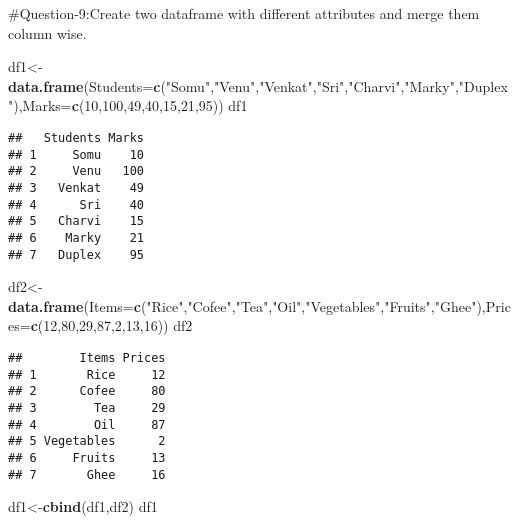 \documentclass[
]{article}
\newenvironment{Shaded}{\begin{snugshade}}{\end{snugshade}}
\newcommand{\AttributeTok}[1]{\textcolor[rgb]{0.13,0.29,0.53}{#1}}
\newcommand{\DecValTok}[1]{\textcolor[rgb]{0.00,0.00,0.81}{#1}}
\newcommand{\FunctionTok}[1]{\textcolor[rgb]{0.13,0.29,0.53}{\textbf{#1}}}
\newcommand{\NormalTok}[1]{#1}
\newcommand{\OtherTok}[1]{\textcolor[rgb]{0.56,0.35,0.01}{#1}}
\newcommand{\StringTok}[1]{\textcolor[rgb]{0.31,0.60,0.02}{#1}}
\begin{document}
\#Question-9:Create two dataframe with different attributes and merge
them column wise.

\begin{Shaded}
\begin{Highlighting}[]
\NormalTok{df1}\OtherTok{\textless{}{-}}\FunctionTok{data.frame}\NormalTok{(}\AttributeTok{Students=}\FunctionTok{c}\NormalTok{(}\StringTok{"Somu"}\NormalTok{,}\StringTok{"Venu"}\NormalTok{,}\StringTok{"Venkat"}\NormalTok{,}\StringTok{"Sri"}\NormalTok{,}\StringTok{"Charvi"}\NormalTok{,}\StringTok{"Marky"}\NormalTok{,}\StringTok{"Duplex"}\NormalTok{),}\AttributeTok{Marks=}\FunctionTok{c}\NormalTok{(}\DecValTok{10}\NormalTok{,}\DecValTok{100}\NormalTok{,}\DecValTok{49}\NormalTok{,}\DecValTok{40}\NormalTok{,}\DecValTok{15}\NormalTok{,}\DecValTok{21}\NormalTok{,}\DecValTok{95}\NormalTok{))}
\NormalTok{df1}
\end{Highlighting}
\end{Shaded}

\begin{verbatim}
##   Students Marks
## 1     Somu    10
## 2     Venu   100
## 3   Venkat    49
## 4      Sri    40
## 5   Charvi    15
## 6    Marky    21
## 7   Duplex    95
\end{verbatim}

\begin{Shaded}
\begin{Highlighting}[]
\NormalTok{df2}\OtherTok{\textless{}{-}}\FunctionTok{data.frame}\NormalTok{(}\AttributeTok{Items=}\FunctionTok{c}\NormalTok{(}\StringTok{"Rice"}\NormalTok{,}\StringTok{"Cofee"}\NormalTok{,}\StringTok{"Tea"}\NormalTok{,}\StringTok{"Oil"}\NormalTok{,}\StringTok{"Vegetables"}\NormalTok{,}\StringTok{"Fruits"}\NormalTok{,}\StringTok{"Ghee"}\NormalTok{),}\AttributeTok{Prices=}\FunctionTok{c}\NormalTok{(}\DecValTok{12}\NormalTok{,}\DecValTok{80}\NormalTok{,}\DecValTok{29}\NormalTok{,}\DecValTok{87}\NormalTok{,}\DecValTok{2}\NormalTok{,}\DecValTok{13}\NormalTok{,}\DecValTok{16}\NormalTok{))}
\NormalTok{df2}
\end{Highlighting}
\end{Shaded}

\begin{verbatim}
##        Items Prices
## 1       Rice     12
## 2      Cofee     80
## 3        Tea     29
## 4        Oil     87
## 5 Vegetables      2
## 6     Fruits     13
## 7       Ghee     16
\end{verbatim}

\begin{Shaded}
\begin{Highlighting}[]
\NormalTok{df1}\OtherTok{\textless{}{-}}\FunctionTok{cbind}\NormalTok{(df1,df2)}
\NormalTok{df1}
\end{Highlighting}
\end{Shaded}
\end{document}
